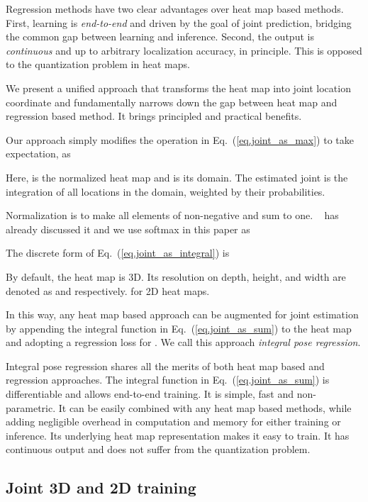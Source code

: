 \documentclass[runningheads]{llncs}
\begin{document}
Regression methods have two clear advantages over heat map based methods. First, learning is \emph{end-to-end} and driven by the goal of joint prediction, bridging the common gap between learning and inference. Second, the output is \emph{continuous} and up to arbitrary localization accuracy, in principle. This is opposed to the quantization problem in heat maps.

We present a unified approach that transforms the heat map into joint location coordinate and fundamentally narrows down the gap between heat map and regression based method. It brings principled and practical benefits. 

Our approach simply modifies the  operation in Eq.~(\ref{eq.joint_as_max}) to take expectation, as



Here,  is the normalized heat map and  is its domain. The estimated joint is the integration of all locations  in the domain, weighted by their probabilities.

Normalization is to make all elements of  non-negative and sum to one. ~\cite{nibali2018numerical} has already discussed it and we use softmax in this paper as



The discrete form of Eq.~(\ref{eq.joint_as_integral}) is



By default, the heat map is 3D. Its resolution on depth, height, and width are denoted as  and  respectively.  for 2D heat maps.

In this way, any heat map based approach can be augmented for joint estimation by appending the integral function in Eq.~(\ref{eq.joint_as_sum}) to the heat map  and adopting a regression loss for . We call this approach \emph{integral pose regression}.

Integral pose regression shares all the merits of both heat map based and regression approaches. The integral function in Eq.~(\ref{eq.joint_as_sum}) is differentiable and allows end-to-end training. It is simple, fast and non-parametric. It can be easily combined with any heat map based methods, while adding negligible overhead in computation and memory for either training or inference. Its underlying heat map representation makes it easy to train. It has continuous output and does not suffer from the quantization problem.

\subsection{Joint 3D and 2D training}
\label{sec.2d_3d_train}
\end{document}

